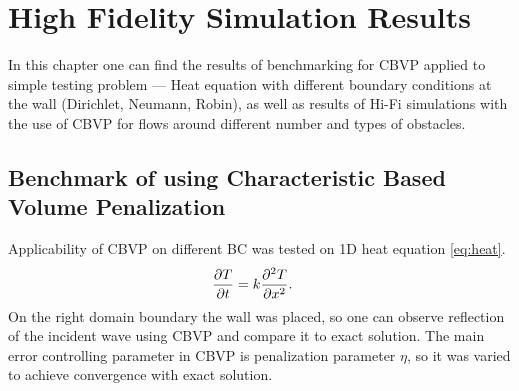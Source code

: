 \chapter{High Fidelity Simulation Results}
\label{chapter:4}
In this chapter one can find  the results of benchmarking for CBVP applied to simple testing problem --- Heat equation with different boundary conditions at the wall (Dirichlet, Neumann, Robin), as well as results of Hi-Fi simulations with the use of CBVP for flows around different number and types of obstacles.

\section{Benchmark of using Characteristic Based Volume Penalization}
Applicability of CBVP on different BC was tested on 1D heat equation \eqref{eq:heat}. 
\begin{align}
\frac {\partial T}{\partial t} &= k \frac {\partial^2 T}{\partial x^2}. \label{eq:heat}
\end{align}
On the right domain boundary the wall was placed, so one can observe reflection of the incident wave using CBVP and compare it to exact solution. The main error controlling parameter in CBVP is penalization parameter $\eta$, so it was varied to achieve convergence with exact solution.

